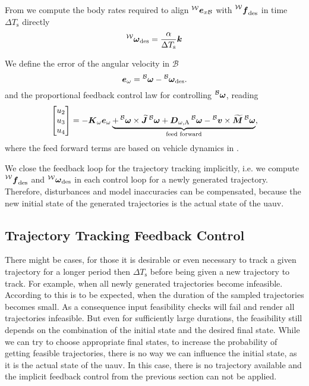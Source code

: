 From  we compute the body rates required to align $\prescript{\mathcal{W}}{}{\mbox{$\bm{e}$}}_{x\mathcal{B}}$ with $\thrustdesiredworld$ in time $\Delta T_{\text{s}}$ directly
\begin{equation}
	\vangdesiredworld = \frac{\alpha}{\Delta T_{\text{s}}} \kb
\end{equation}

We define the error of the angular velocity in $\mathcal{B}$
\begin{equation}
	\eb_{\omega} = \vangbody - \vangdesiredbody
	.
\end{equation}
and the proportional feedback control law for controlling $\prescript{\mathcal{B}}{}{\mbox{$\bm{\omega}$}}$, reading
\begin{equation}
	\begin{bmatrix}
		u_2 \\ u_3 \\ u_4
	\end{bmatrix}
	=
	-\mbox{$\bm{K}$}_{\omega} \mbox{$\bm{e}$}_{\omega}
	\underbrace{+
		\prescript{\mathcal{B}}{}{\mbox{$\bm{\omega}$}} \times \mbox{$\widetilde{\bm{J}}$} \prescript{\mathcal{B}}{}{\mbox{$\bm{\omega}$}}
		+ \mbox{$\bm{D}$}_{\omega,\text{A}} \prescript{\mathcal{B}}{}{\mbox{$\bm{\omega}$}}
		- \prescript{\mathcal{B}}{}{\mbox{$\bm{v}$}} \times \mbox{$\widetilde{\bm{M}}$} \prescript{\mathcal{B}}{}{\mbox{$\bm{\omega}$}}
	}_{\text{feed forward}}
	,
\end{equation}
where the feed forward terms are based on vehicle dynamics in .

We close the feedback loop for the trajectory tracking implicitly, i.e. we compute $\thrustdesiredworld$ and $\vangdesiredworld$ in each control loop for a newly generated trajectory.
Therefore, disturbances and model inaccuracies can be compensated, because the new initial state of the generated trajectories is the actual state of the \ac{uauv}.

\subsection{Trajectory Tracking Feedback Control}
There might be cases, for those it is desirable or even necessary to track a given trajectory for a longer period then $\Delta T_{\text{s}}$ before being given a new trajectory to track.
For example, when all newly generated trajectories become infeasible. According to \cite{MuellerHehn15} this is to be expected, when the duration of the sampled trajectories becomes small.
As a consequence input feasibility checks will fail and render all trajectories infeasible.
But even for sufficiently large durations, the feasibility still depends on the combination of the initial state and the desired final state.
While we can try to choose appropriate final states, to increase the probability of getting feasible trajectories, there is no way we can influence the initial state, as it is the actual state of the \ac{uauv}.
In this case, there is no trajectory available and the implicit feedback control from the previous section can not be applied.

